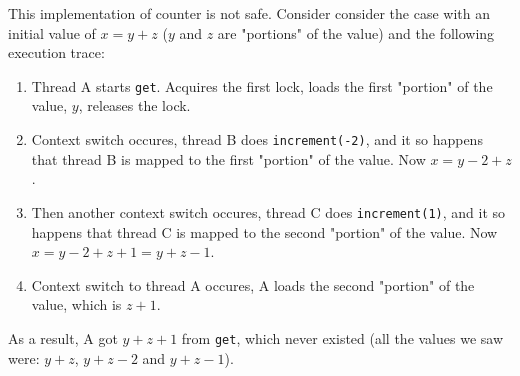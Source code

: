 \documentclass[a4paper,12pt]{article}
\begin{document}
This implementation of counter is not safe. Consider consider the case with an initial value of $x = y + z$ ($y$ and $z$ are "portions" of the value) and the following execution trace:
\begin{enumerate}
\item Thread A starts \verb|get|. Acquires the first lock, loads the first "portion" of the value, $y$, releases the lock.
\item Context switch occures, thread B does \verb|increment(-2)|, and it so happens that thread B is mapped to the first "portion" of the value. Now $x = y - 2 + z$.
\item Then another context switch occures, thread C does \verb|increment(1)|, and it so happens that thread C is mapped to the second "portion" of the value. Now $x = y - 2 + z + 1 = y + z - 1$.
\item Context switch to thread A occures, A loads the second "portion" of the value, which is $z + 1$.
\end{enumerate}

As a result, A got $y + z + 1$ from \verb|get|, which never existed (all the values we saw were: $y + z$, $y + z - 2$ and $y + z - 1$).
\end{document}
